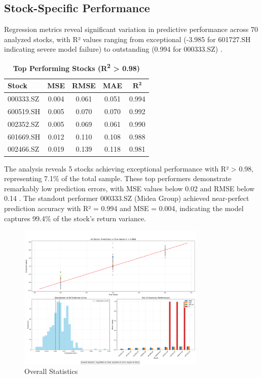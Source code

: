 \documentclass[3p,times,procedia]{elsarticle}
\begin{document}
\subsection{Stock-Specific Performance}
Regression metrics reveal significant variation in predictive performance across 70 analyzed stocks, with R² values ranging from exceptional (-3.985 for 601727.SH indicating severe model failure) to outstanding (0.994 for 000333.SZ) \cite{Fischer2018, Sezer2020}.

\begin{table}[!ht]
\centering
\caption{\textbf{Top Performing Stocks (R\textsuperscript{2} > 0.98)}}
\renewcommand{\arraystretch}{1.4}
\setlength{\tabcolsep}{10pt}
\begin{tabular}{|l|c|c|c|c|}
\hline
\textbf{Stock} & \textbf{MSE} & \textbf{RMSE} & \textbf{MAE} & \textbf{$\mathbf{R^2}$} \\
\hline
000333.SZ  & 0.004 & 0.061 & 0.051 & 0.994 \\
600519.SH  & 0.005 & 0.070 & 0.070 & 0.992 \\
002352.SZ  & 0.005 & 0.069 & 0.061 & 0.990 \\
601669.SH  & 0.012 & 0.110 & 0.108 & 0.988 \\
002466.SZ  & 0.019 & 0.139 & 0.118 & 0.981 \\
\hline
\end{tabular}
\end{table}

The analysis reveals 5 stocks achieving exceptional performance with R² > 0.98, representing 7.1\% of the total sample. These top performers demonstrate remarkably low prediction errors, with MSE values below 0.02 and RMSE below 0.14 \cite{Bao2017}. The standout performer 000333.SZ (Midea Group) achieved near-perfect prediction accuracy with R² = 0.994 and MSE = 0.004, indicating the model captures 99.4\% of the stock's return variance.
\begin{figure}[!ht] %
    \centering
    \includegraphics[width=0.80\textwidth]{Picture3.png} %

    \caption{Overall Statistics}
    \label{fig:Return Forecast Calculation}
\end{figure}
\end{document}
